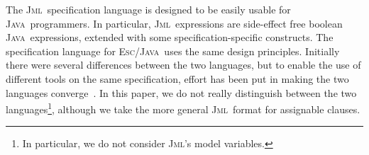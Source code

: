 \documentclass[a4paper]{llncs}
\newcommand{\jml}{\textsc{Jml}}
\newcommand{\escj}{\textsc{Esc/Java}}
\newcommand{\java}{\textsc{Java}}
\begin{document}

The \jml\ specification language is designed to be 
easily usable for \java\ programmers. In particular, \jml\ expressions
are side-effect free boolean \java\ expressions, extended with some
specification-specific constructs. The specification language for
\escj\ uses the same design principles. Initially there were several
differences between the two languages, but to enable the use of
different tools on the same specification, effort has been put in
making the two languages converge~\cite{EscJmlDiff}. In this paper, we 
do not really distinguish between the two languages\footnote{In
particular, we do not consider \jml's model variables.}, although we
take the more general \jml\ format for assignable clauses.
\end{document}
